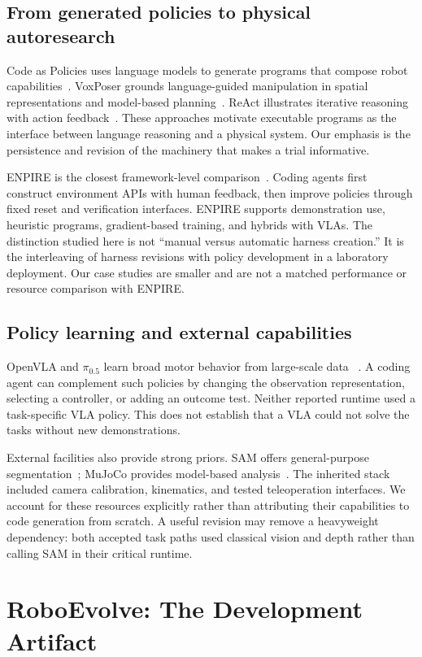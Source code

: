 \subsection{From generated policies to physical autoresearch}
Code as Policies uses language models to generate programs that compose robot
capabilities~\cite{cap}. VoxPoser grounds language-guided manipulation in
spatial representations and model-based planning~\cite{voxposer}. ReAct
illustrates iterative reasoning with action feedback~\cite{react}. These
approaches motivate executable programs as the interface between language
reasoning and a physical system. Our emphasis is the persistence and revision
of the machinery that makes a trial informative.

ENPIRE is the closest framework-level comparison~\cite{enpire}. Coding agents
first construct environment APIs with human feedback, then improve policies
through fixed reset and verification interfaces. ENPIRE supports demonstration
use, heuristic programs, gradient-based training, and hybrids with VLAs. The
distinction studied here is not ``manual versus automatic harness creation.''
It is the interleaving of harness revisions with policy development in a
laboratory deployment. Our case studies are smaller and are not a matched
performance or resource comparison with ENPIRE.

\subsection{Policy learning and external capabilities}
OpenVLA and $\pi_{0.5}$ learn broad motor behavior from large-scale data
~\cite{openvla,pi05}. A coding agent can complement such policies by changing
the observation representation, selecting a controller, or adding an outcome
test. Neither reported runtime used a task-specific VLA policy. This does not
establish that a VLA could not solve the tasks without new demonstrations.

External facilities also provide strong priors. SAM offers general-purpose
segmentation~\cite{sam}; MuJoCo provides model-based analysis~\cite{mujoco}.
The inherited stack included camera calibration, kinematics, and tested
teleoperation interfaces. We account for these resources explicitly rather
than attributing their capabilities to code generation from scratch. A useful
revision may remove a heavyweight dependency: both accepted task paths used
classical vision and depth rather than calling SAM in their critical runtime.

\section{RoboEvolve: The Development Artifact}
